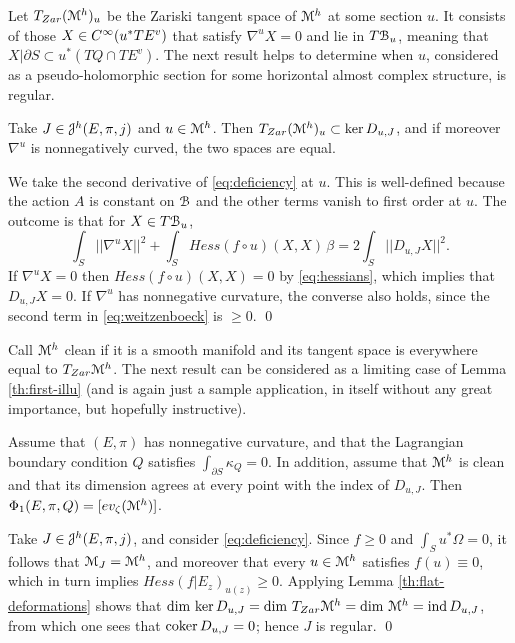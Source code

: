 \documentclass[10pt,letterpaper]{article}
\begin{document}
Let $T_{Zar}(\mathcal{M}^h)_u$ be the Zariski tangent space of $\mathcal{M}^h$ at some section
$u$. It consists of those $X \in C^\infty(u^*TE^v)$ that satisfy $\nabla^uX = 0$
and lie in $T\mathcal{B}_u$, meaning that $X|\partial S \subset u^*(TQ \cap TE^v)$. The
next result helps to determine when $u$, considered as a pseudo-holomorphic
section for some horizontal almost complex structure, is regular.

\begin{lemma} \label{th:flat-deformations}
Take $J \in \mathcal{J}^h(E,\pi,j)$ and $u \in \mathcal{M}^h$. Then $T_{Zar}(\mathcal{M}^h)_u \subset
\mathrm{ker}\, D_{u,J}$, and if moreover $\nabla^u$ is nonnegatively curved, the two
spaces are equal.
\end{lemma}

\proof We take the second derivative of \eqref{eq:deficiency} at $u$. This is
well-defined because the action $A$ is constant on $\mathcal{B}$ and the other terms
vanish to first order at $u$. The outcome is that for $X \in T\mathcal{B}_u$,
\begin{equation} \label{eq:weitzenboeck}
\int_S ||\nabla^u X||^2 + \int_S Hess(f \circ u)(X,X) \,\beta = 2 \int_S
||D_{u,J}X||^2.
\end{equation}
If $\nabla^uX = 0$ then $Hess(f \circ u)(X,X) = 0$ by \eqref{eq:hessians},
which implies that $D_{u,J}X = 0$. If $\nabla^u$ has nonnegative curvature, the
converse also holds, since the second term in \eqref{eq:weitzenboeck} is $\geq
0$. \qed

Call $\mathcal{M}^h$ clean if it is a smooth manifold and its tangent space is
everywhere equal to $T_{Zar}\mathcal{M}^h$. The next result can be considered as a
limiting case of Lemma \ref{th:first-illu} (and is again just a sample
application, in itself without any great importance, but hopefully
instructive).

\begin{lemma}
Assume that $(E,\pi)$ has nonnegative curvature, and that the Lagrangian
boundary condition $Q$ satisfies $\int_{\partial S} \kappa_Q = 0$. In addition,
assume that $\mathcal{M}^h$ is clean and that its dimension agrees at every point with
the index of $D_{u,J}$. Then $\Phi_1(E,\pi,Q) = [ev_{\zeta}(\mathcal{M}^h)]$.
\end{lemma}

\proof Take $J \in \mathcal{J}^h(E,\pi,j)$, and consider \eqref{eq:deficiency}. Since
$f \geq 0$ and $\int_S u^*\Omega = 0$, it follows that $\mathcal{M}_J = \mathcal{M}^h$, and
moreover that every $u \in \mathcal{M}^h$ satisfies $f(u) \equiv 0$, which in turn
implies $Hess(f|E_z)_{u(z)} \geq 0$. Applying Lemma \ref{th:flat-deformations}
shows that $\dim\, \mathrm{ker}\, D_{u,J} = \dim\,T_{Zar}\mathcal{M}^h = \dim\,\mathcal{M}^h =
\mathrm{ind}\,D_{u,J}$, from which one sees that $\mathrm{coker}\, D_{u,J} = 0$; hence $J$ is
regular. \qed
\end{document}
